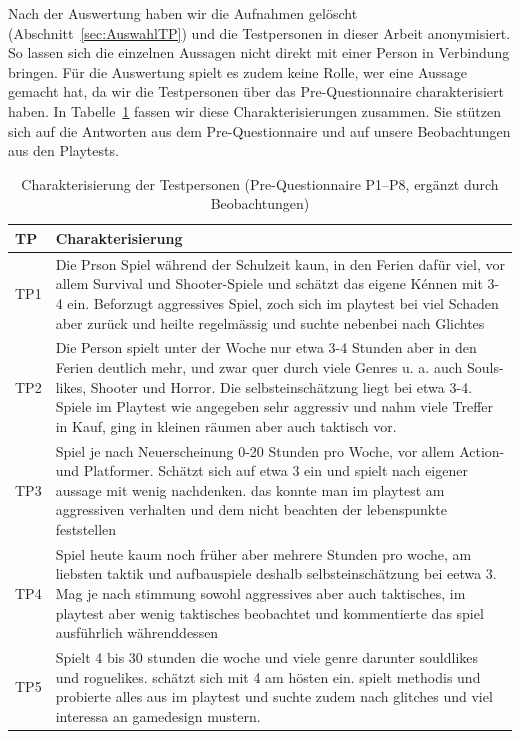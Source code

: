 \documentclass[../Main.tex]{subfiles}
\begin{document}
Nach der Auswertung haben wir die Aufnahmen gelöscht (Abschnitt~\ref{sec:AuswahlTP}) und die Testpersonen in dieser Arbeit anonymisiert. So lassen sich die einzelnen Aussagen nicht direkt mit einer Person in Verbindung bringen. Für die Auswertung spielt es zudem keine Rolle, wer eine Aussage gemacht hat, da wir die Testpersonen über das Pre-Questionnaire charakterisiert haben. In Tabelle~\ref{tab:Testpersonen} fassen wir diese Charakterisierungen zusammen. Sie stützen sich auf die Antworten aus dem Pre-Questionnaire und auf unsere Beobachtungen aus den Playtests.
\begin{table}[H]
    \centering
    \small
    \renewcommand{\arraystretch}{1.3}
    \begin{tabular}{|>{\raggedright\arraybackslash}p{1.2cm}|>{\raggedright\arraybackslash}p{12.6cm}|}
        \hline
        \textbf{TP} & \textbf{Charakterisierung} \\
        \hline
        TP1 & Die Prson Spiel während der Schulzeit kaun, in den Ferien dafür viel, vor allem Survival und Shooter-Spiele und schätzt das eigene Kénnen mit 3-4 ein. Beforzugt aggressives Spiel, zoch sich im playtest bei viel Schaden aber zurück und heilte regelmässig und suchte nebenbei nach Glichtes \\
        \hline
        TP2 & Die Person spielt unter der Woche nur etwa 3-4 Stunden aber in den Ferien deutlich mehr, und zwar quer durch viele Genres u. a. auch Souls-likes, Shooter und Horror. Die selbsteinschätzung liegt bei etwa 3-4. Spiele im Playtest wie angegeben sehr aggressiv und nahm viele Treffer in Kauf, ging in kleinen räumen aber auch taktisch vor. \\
        \hline
        TP3 & Spiel je nach Neuerscheinung 0-20 Stunden pro Woche, vor allem Action- und Platformer. Schätzt sich auf etwa 3 ein und spielt nach eigener aussage mit wenig nachdenken. das konnte man im playtest am aggressiven verhalten und dem nicht beachten der lebenspunkte feststellen \\
        \hline
        TP4 & Spiel heute kaum noch früher aber mehrere Stunden pro woche, am liebsten taktik und aufbauspiele deshalb selbsteinschätzung bei eetwa 3. Mag je nach stimmung sowohl aggressives aber auch taktisches, im playtest aber wenig taktisches beobachtet und kommentierte das spiel ausführlich währenddessen \\
        \hline
        TP5 & Spielt 4 bis 30 stunden die woche und viele genre darunter souldlikes und roguelikes. schätzt sich mit 4 am hösten ein. spielt methodis und probierte alles aus im playtest und suchte zudem nach glitches und viel interessa an gamedesign mustern. \\
        \hline
    \end{tabular}
    \caption{Charakterisierung der Testpersonen (Pre-Questionnaire P1--P8, ergänzt durch Beobachtungen)}
    \label{tab:Testpersonen}
\end{table}
\end{document}
